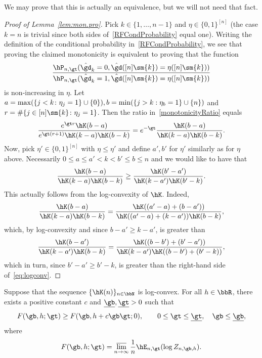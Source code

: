 We may prove that this is actually an equivalence, but we will not need that fact.

\begin{proof}[Proof of Lemma~\ref{lem:mon.pro}]
Pick $k \in \{1,\ldots,n - 1\}$ and $\eta \in \{0,1\}^{[n]}$ (the case $k=n$ is trivial since both sides of~\eqref{RFCondProbability} equal one). Writing the definition of the conditional probability in~\eqref{RFCondProbability}, we see that proving the claimed monotonicity is equivalent to proving that the function
\begin{equation}\label{monotonicityRatio}
\frac{\hP_{n,\gt}(\hat \gd_k = 0, \hat \gd([n] \sm \{k\}) = \eta([n] \sm \{k\}))}{\hP_{n,\gt}(\hat \gd_k = 1, \hat \gd([n] \sm \{k\}) = \eta([n] \sm \{k\}))}
\end{equation}
is non-increasing in $\eta$. Let $a = \max(\{j < k \colon \eta_j = 1\}\cup\{0\}), b = \min(\{j > k :\linebreak \eta_b = 1\}\cup\{n\})$ and $r = \# \{j \in [n] \sm \{k\} \colon \eta_j = 1\}$. Then the ratio in~\eqref{monotonicityRatio} equals
\begin{equation}
\frac{e^{\gt r} \hK(b - a)}{e^{\gt (r + 1)} \hK(k - a) \hK(b - k)} = e^{- \gt} \frac{\hK(b - a)}{\hK(k - a)\hK(b - k)}.
\end{equation}
Now, pick $\eta' \in \{0,1\}^{[n]}$ with $\eta \leq \eta'$ and define $a', b'$ for $\eta'$ similarly as for $\eta$ above. Necessarily $0 \leq a \leq a' < k < b' \leq b \leq n$ and we would like to have that
\begin{equation}\label{eq:logconv}
\frac{\hK(b - a)}{\hK(k - a) \hK(b - k)} \geq \frac{\hK(b' - a')}{\hK(k - a') \hK(b' - k)}.
\end{equation}
This actually follows from the log-convexity of $\hK$. Indeed,
\begin{equation}
\frac{\hK(b - a)}{\hK(k - a) \hK(b - k)} = \frac{\hK((a' - a) + (b - a'))}{\hK((a' - a) + (k - a')) \hK(b - k)},
\end{equation}
which, by log-convexity and since $b - a' \geq k - a'$, is greater than
\begin{equation}
\frac{\hK(b - a')}{\hK(k - a') \hK(b - k)} = \frac{\hK((b - b') + (b' - a'))}{\hK(k - a') \hK((b - b') + (b' - k))},
\end{equation}
which in turn, since $b' - a' \geq b' - k$, is greater than the right-hand side of~\eqref{eq:logconv}.
\end{proof}
\begin{lemm} \label{lem:comp.tilt.shift}
Suppose that the sequence $\{\hK(n)\}_{n \in \bbN}$ is log-convex. For all $h \in \bbR$, there exists a positive constant $c$ and $\underline \gb,\underline \gt > 0$ such that
\begin{equation}
F(\gb,h;\gt) \geq F(\gb,h + c \gb \gt;0), \qquad 0 \leq \gt \leq \underline \gt, \quad \gb \leq \underline \gb,
\end{equation}
where
\begin{equation}\label{eq:defFtilt}
F(\gb,h;\gt) = \varlimsup_{n \to \infty} \frac{1}{n} \hE_{n,\gt} (\log Z_{n,\gb,h}).
\end{equation}
\end{lemm}
